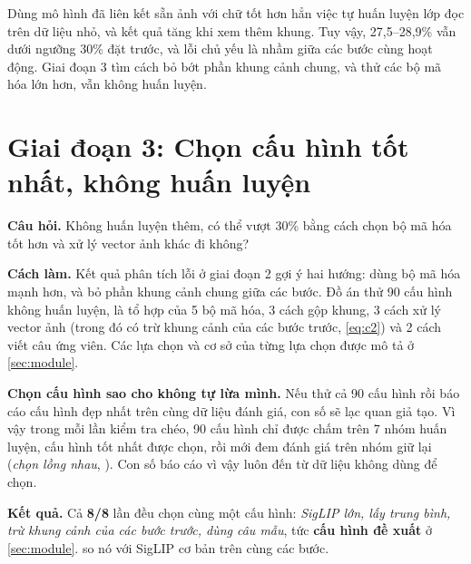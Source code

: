 \documentclass[a4paper,oneside]{report}
\begin{document}
\begin{ketqua}
Dùng mô hình đã liên kết sẵn ảnh với chữ tốt hơn hẳn việc tự huấn luyện lớp đọc trên dữ liệu nhỏ, và kết quả tăng khi xem thêm khung. Tuy vậy, 27,5--28,9\% vẫn dưới ngưỡng 30\% đặt trước, và lỗi chủ yếu là nhầm giữa các bước cùng hoạt động. Giai đoạn 3 tìm cách bỏ bớt phần khung cảnh chung, và thử các bộ mã hóa lớn hơn, vẫn không huấn luyện.
\end{ketqua}

\section{Giai đoạn 3: Chọn cấu hình tốt nhất, không huấn luyện}
\label{sec:stage3}

\textbf{Câu hỏi.} Không huấn luyện thêm, có thể vượt 30\% bằng cách chọn bộ mã hóa tốt hơn và xử lý vector ảnh khác đi không?

\textbf{Cách làm.} Kết quả phân tích lỗi ở giai đoạn 2 gợi ý hai hướng: dùng bộ mã hóa mạnh hơn, và bỏ phần khung cảnh chung giữa các bước. Đồ án thử 90 cấu hình không huấn luyện, là tổ hợp của 5 bộ mã hóa, 3 cách gộp khung, 3 cách xử lý vector ảnh (trong đó có trừ khung cảnh của các bước trước, \cref{eq:c2}) và 2 cách viết câu ứng viên. Các lựa chọn và cơ sở của từng lựa chọn được mô tả ở \cref{sec:module}.

\textbf{Chọn cấu hình sao cho không tự lừa mình.} Nếu thử cả 90 cấu hình rồi báo cáo cấu hình đẹp nhất trên cùng dữ liệu đánh giá, con số sẽ lạc quan giả tạo. Vì vậy trong mỗi lần kiểm tra chéo, 90 cấu hình chỉ được chấm trên 7 nhóm huấn luyện, cấu hình tốt nhất được chọn, rồi mới đem đánh giá trên nhóm giữ lại (\textit{chọn lồng nhau}, \citealp{cawley2010overfitting}). Con số báo cáo vì vậy luôn đến từ dữ liệu không dùng để chọn.

\textbf{Kết quả.} Cả \textbf{8/8} lần đều chọn cùng một cấu hình: \textit{SigLIP lớn, lấy trung bình, trừ khung cảnh của các bước trước, dùng câu mẫu}, tức \textbf{cấu hình đề xuất} ở \cref{sec:module}.  so nó với SigLIP cơ bản trên cùng các bước.
\end{document}
